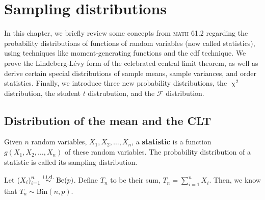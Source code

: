 \chapter{Sampling distributions}
In this chapter, we briefly review some concepts from \textsc{math} 61.2 regarding the probability distributions of functions of random variables (now called statistics), using techniques like moment-generating functions and the cdf technique. 
We prove the Lindeberg-L\'evy form of the celebrated central limit theorem, as well as derive certain special distributions of sample means, sample variances, and order statistics. 
Finally, we introduce three new probability distributions, the \(\upchi^2\) distribution, the student \(t\) distrubution, and the \(\mathscr{F}\) distribution. 
\section{Distribution of the mean and the CLT}
Given \(n\) random variables, \(X_1,X_2,\ldots, X_n\), a \textbf{statistic} is a function \(g(X_1, X_2,\ldots, X_n)\) of these random variables. 
The probability distribution of a statistic is called its sampling distribution. 
\begin{example}
    Let \({(X_i)}_{i=1}^n\stackrel{\mathrm{i.i.d.}}{\sim} \mathrm{Be}(p)\). 
    Define \(T_n\) to be their sum, \(T_n = \sum_{i=1}^n X_i\). 
    Then, we know that \(T_n \sim \mathrm{Bin}(n,p)\). 
\end{example}
